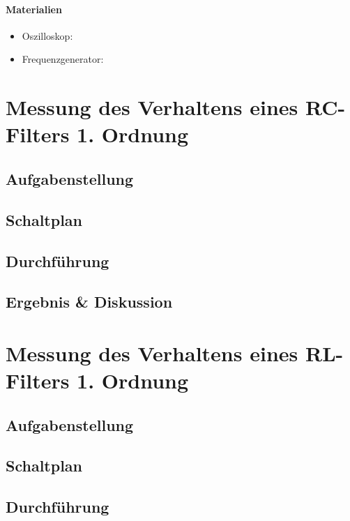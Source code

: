 \documentclass[12pt,a4paper,titlepage]{article}
\begin{document}
\setcounter{page}{2}

\newpage
\setcounter{tocdepth}{1}
\tableofcontents

\newpage

\paragraph{Materialien}
\begin{itemize}
	\item Oszilloskop:
	\item Frequenzgenerator:
\end{itemize}

\section{Messung des Verhaltens eines RC-Filters 1. Ordnung}

\subsection{Aufgabenstellung}

\subsection{Schaltplan}

\subsection{Durchführung}

\subsection{Ergebnis & Diskussion}

\section{Messung des Verhaltens eines RL-Filters 1. Ordnung}

\subsection{Aufgabenstellung}

\subsection{Schaltplan}

\subsection{Durchführung}
\end{document}
